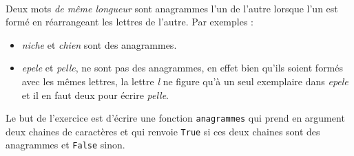 \documentclass[11pt,a4paper]{article}
\begin{document}
\begin{Exercise}[title = {anagrammes}] \\
	Deux mots \textit{de même longueur} sont anagrammes l'un de l'autre lorsque l'un est formé en réarrangeant les lettres de l'autre. Par exemples :
	\begin{itemize}
		\item \textit{niche} et \textit{chien} sont des anagrammes.
		\item \textit{epele} et \textit{pelle}, ne sont pas des anagrammes, en effet bien qu'ils soient formés avec les mêmes lettres, la lettre \textit{l} ne figure qu'à un seul exemplaire dans \textit{epele} et il en faut deux pour écrire \textit{pelle}.
	\end{itemize}
	Le but de l'exercice est d'écrire une fonction {\tt anagrammes} qui prend en argument deux chaines de caractères et qui renvoie {\tt True} si ces deux chaines sont des anagrammes et {\tt False} sinon.


\end{Exercise}
\end{document}
